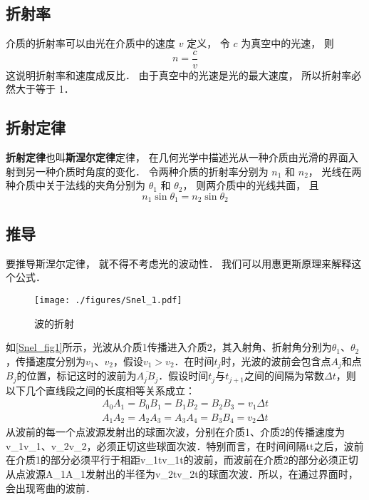 
\subsection{折射率}
介质的折射率可以由光在介质中的速度 $v$ 定义， 令 $c$ 为真空中的光速， 则
\begin{equation}
n = \frac{c}{v}
\end{equation}
这说明折射率和速度成反比． 由于真空中的光速是光的最大速度， 所以折射率必然大于等于 1．

\subsection{折射定律}

\textbf{折射定律}也叫\textbf{斯涅尔定律}定律， 在几何光学中描述光从一种介质由光滑的界面入射到另一种介质时角度的变化． 令两种介质的折射率分别为 $n_1$ 和 $n_2$， 光线在两种介质中关于法线的夹角分别为 $\theta_1$ 和 $\theta_2$， 则两介质中的光线共面， 且
\begin{equation}
n_1 \sin\theta_1 = n_2 \sin\theta_2
\end{equation}


\subsection{推导}
要推导斯涅尔定律， 就不得不考虑光的波动性． 我们可以用惠更斯原理来解释这个公式．
\begin{figure}[ht]
\centering
\texttt{[image: ./figures/Snel\_1.pdf]}
\caption{波的折射} \label{Snel_fig1}
\end{figure}
如\autoref{Snel_fig1}所示，光波从介质1传播进入介质2，其入射角、折射角分别为$\theta_1$、$\theta_2$，传播速度分别为$v_1$、$v_2$，假设$v_1>v_2$．在时间$t_{j}$时，光波的波前会包含点$A_{j}$和点$B_{j}$的位置，标记这时的波前为$\overline {A_{j}B_{j}}$．假设时间$t_{j}$与$t_{{j+1}}$之间的间隔为常数$\Delta t$，则以下几个直线段之间的长度相等关系成立：
\begin{equation}
\begin{aligned}
A_{0}A_{1}=B_{0}B_{1}=B_{1}B_{2}=B_{2}B_{3}=v_{1}\Delta t \\
A_{1}A_{2}=A_{2}A_{3}=A_{3}A_{4}=B_{3}B_{4}=v_{2}\Delta t
\end{aligned}
\end{equation}
从波前{}的每一个点波源发射出的球面次波，分别在介质1、介质2的传播速度为{\displaystyle v_{1}}v_1、{\displaystyle v_{2}}v_2，{}必须正切这些球面次波．特别而言，在时间间隔{\displaystyle \Delta t}\Delta t之后，波前{}在介质1的部分必须平行于相距{\displaystyle v_{1}\Delta t}v_{1}\Delta t的波前{}，而波前{}在介质2的部分必须正切从点波源{\displaystyle A_{1}}A_{1}发射出的半径为{\displaystyle v_{2}\Delta t}v_{2}\Delta t的球面次波．所以，在通过界面时，会出现弯曲的波前{}．

